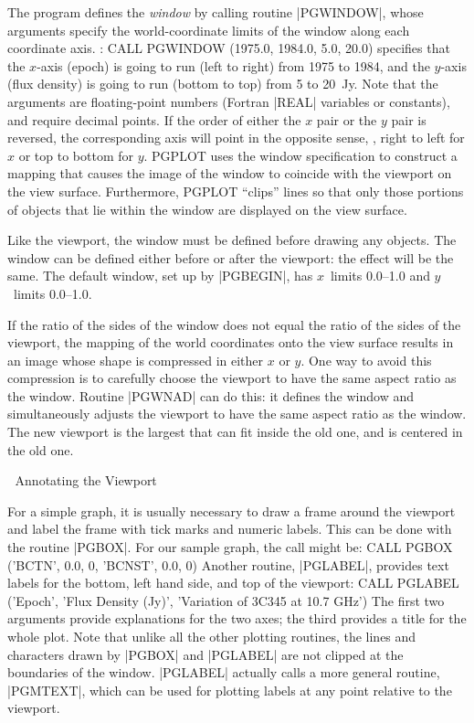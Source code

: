The program defines the {\it window} by calling routine |PGWINDOW|, whose
arguments specify the world-coordinate limits of the window
along each coordinate axis. \eg: 
\begintt
CALL PGWINDOW (1975.0, 1984.0, 5.0, 20.0)
\endtt
specifies that the $x$-axis (epoch) is going to run (left to right) from
1975 to 1984, and the $y$-axis (flux density) is going to run (bottom to
top) from 5 to 20~Jy. Note that the arguments are floating-point numbers
(Fortran |REAL| variables or constants), and require decimal points. If
the order of either the $x$ pair or the $y$ pair is reversed, the
corresponding axis will point in the opposite sense, \ie, right to left
for $x$ or top to bottom for $y$. PGPLOT uses the window specification
to construct a mapping that causes the image of the window to coincide
with the viewport on the view surface. Furthermore, PGPLOT ``clips''
lines so that only those portions of objects that lie within the window
are displayed on the view surface. 

Like the viewport, the window must be defined before drawing any
objects. The window can be defined either before or after the viewport:
the effect will be the same.  The default window, set up by |PGBEGIN|,
has $x$~limits 0.0--1.0 and $y$~limits 0.0--1.0.

If the ratio of the sides of the window does not equal the ratio of 
the sides of the viewport, the mapping of the world coordinates onto 
the view surface results in an image whose shape is compressed in either 
$x$ or $y$.  One way to avoid this compression is to carefully choose
the viewport to have the same aspect ratio as the window.  Routine
|PGWNAD| can do this: it defines the window and simultaneously adjusts
the viewport to have the same aspect ratio as the window.  The new 
viewport is the largest that can fit inside the old one, and is centered 
in the old one.


\beginsection Annotating the Viewport

For a simple graph, it is usually necessary to draw a frame around
the viewport and label the frame with tick marks and numeric labels.
This can be done with the routine |PGBOX|.  For
our sample graph, the call might be:
\begintt
CALL PGBOX ('BCTN', 0.0, 0, 'BCNST', 0.0, 0)
\endtt
Another routine, |PGLABEL|, provides text labels for the bottom, left
hand side, and top of the viewport:
\begintt
CALL PGLABEL ('Epoch', 'Flux Density (Jy)',
              'Variation of 3C345 at 10.7 GHz')
\endtt
The first two arguments provide explanations for the two axes; the
third provides a title for the whole plot. Note that unlike all the
other plotting routines, the lines and characters drawn by |PGBOX| and
|PGLABEL| are not clipped at the boundaries of the window.  |PGLABEL|
actually calls a more general routine, |PGMTEXT|, which
can be used for plotting labels at any point relative to the viewport.

